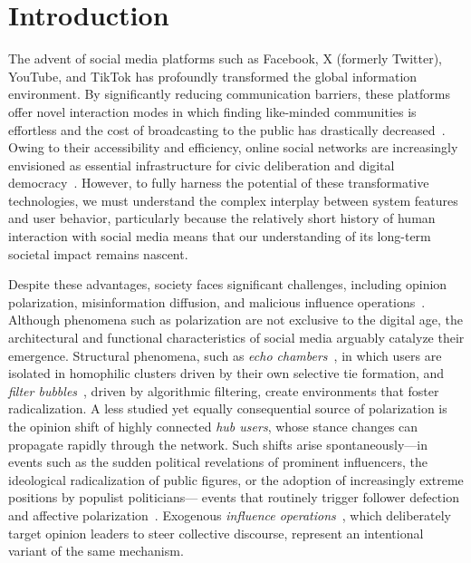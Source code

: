 \documentclass[pdflatex,sn-mathphys-num]{sn-jnl}%
\theoremstyle{thmstyleone}%
\theoremstyle{thmstyletwo}%
\theoremstyle{thmstylethree}%
\def\Dgreen{\color[rgb]{0.02,0.55,0.04}}
\begin{document}
\section{Introduction}\label{Intro}
The advent of social media platforms such as Facebook, X (formerly Twitter), YouTube, and TikTok has profoundly transformed the global information environment. By significantly reducing communication barriers, these platforms offer novel interaction modes in which finding like-minded communities is effortless and the cost of broadcasting to the public has drastically decreased~\cite{Cheung2011,Carr2015,Nyhan2023}. Owing to their accessibility and efficiency, online social networks are increasingly envisioned as essential infrastructure for civic deliberation and digital democracy~\cite{Smith2021,Tseng2022,Yang2025}. However, to fully harness the potential of these transformative technologies, we must understand the complex interplay between system features and user behavior, particularly because the relatively short history of human interaction with social media means that our understanding of its long-term societal impact remains nascent.
\par


Despite these advantages, society faces significant challenges, including opinion polarization, misinformation diffusion, and malicious influence operations~\cite{Fisher2015,Baccarella2018,Conover2011}. Although phenomena such as polarization are not exclusive to the digital age, the architectural and functional characteristics of social media arguably catalyze their emergence. Structural phenomena, such as \emph{echo chambers}~\cite{Cinelli2020,Sasahara2021}, in which users are isolated in homophilic clusters driven by their own selective tie formation, and \emph{filter bubbles}~\cite{Uthsav2020,Lien2022}, driven by algorithmic filtering, create environments that foster radicalization. 
\Dgreen
A less studied yet equally consequential source of polarization 
is the opinion shift of highly connected \emph{hub users}, 
whose stance changes can propagate rapidly through the network. 
Such shifts arise spontaneously---in events such as the sudden political revelations of
prominent influencers, the ideological radicalization of public figures,
or the adoption of increasingly extreme positions by populist politicians---
events that routinely trigger follower defection and affective polarization~\cite{Flamino2023,Bail2018}.
Exogenous \emph{influence operations}~\cite{Fisher2015,Pascal2016,Golovchenko2020},
which deliberately target opinion leaders to steer collective discourse,
represent an intentional variant of the same mechanism.
\par
\end{document}
